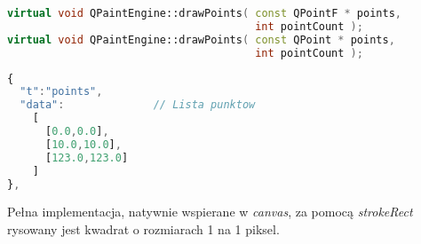 
\begin{lstlisting}[language=C++,numbers=none]
virtual void QPaintEngine::drawPoints( const QPointF * points, 
                                       int pointCount );
virtual void QPaintEngine::drawPoints( const QPoint * points, 
                                       int pointCount );
\end{lstlisting}
\begin{lstlisting}[language=JavaScript,numbers=none]
{
  "t":"points",
  "data":              // Lista punktow
    [
      [0.0,0.0],
      [10.0,10.0],
      [123.0,123.0]
    ]
},
\end{lstlisting}

Pełna implementacja, natywnie wspierane w \emph{canvas}, za pomocą \emph{strokeRect} rysowany jest kwadrat o rozmiarach 1 na 1 piksel.